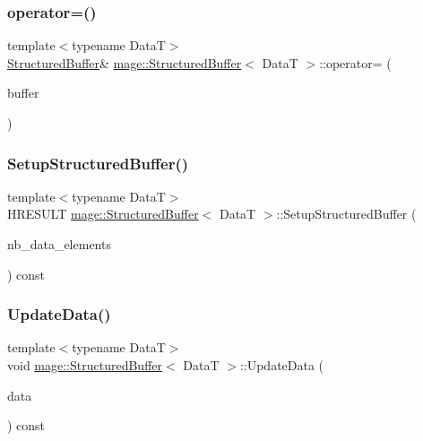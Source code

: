 \subsubsection{\texorpdfstring{operator=()}{operator=()}\hspace{0.1cm}{\footnotesize\ttfamily [2/2]}}
{\footnotesize\ttfamily template$<$typename DataT$>$ \\
\hyperlink{structmage_1_1_structured_buffer}{Structured\+Buffer}\& \hyperlink{structmage_1_1_structured_buffer}{mage\+::\+Structured\+Buffer}$<$ DataT $>$\+::operator= (\begin{DoxyParamCaption}\item[{\hyperlink{structmage_1_1_structured_buffer}{Structured\+Buffer}$<$ DataT $>$ \&\&}]{buffer }\end{DoxyParamCaption})\hspace{0.3cm}{\ttfamily [delete]}}

\hypertarget{structmage_1_1_structured_buffer_a087801ae0e825bdc6a87f6c2c0f91a3f}{}\label{structmage_1_1_structured_buffer_a087801ae0e825bdc6a87f6c2c0f91a3f} 
\subsubsection{\texorpdfstring{Setup\+Structured\+Buffer()}{SetupStructuredBuffer()}}
{\footnotesize\ttfamily template$<$typename DataT$>$ \\
H\+R\+E\+S\+U\+LT \hyperlink{structmage_1_1_structured_buffer}{mage\+::\+Structured\+Buffer}$<$ DataT $>$\+::Setup\+Structured\+Buffer (\begin{DoxyParamCaption}\item[{size\+\_\+t}]{nb\+\_\+data\+\_\+elements }\end{DoxyParamCaption}) const\hspace{0.3cm}{\ttfamily [private]}}

\hypertarget{structmage_1_1_structured_buffer_aac2597ea7ee586207bf4918c3b4f9798}{}\label{structmage_1_1_structured_buffer_aac2597ea7ee586207bf4918c3b4f9798} 
\subsubsection{\texorpdfstring{Update\+Data()}{UpdateData()}}
{\footnotesize\ttfamily template$<$typename DataT$>$ \\
void \hyperlink{structmage_1_1_structured_buffer}{mage\+::\+Structured\+Buffer}$<$ DataT $>$\+::Update\+Data (\begin{DoxyParamCaption}\item[{const vector$<$ DataT $>$ \&}]{data }\end{DoxyParamCaption}) const}



